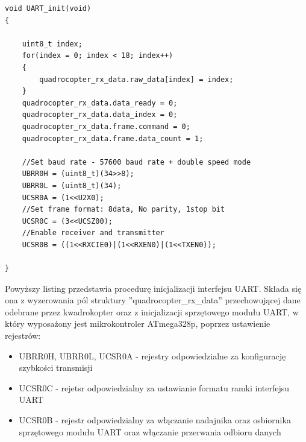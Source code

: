 \begin{lstlisting}
void UART_init(void)
{

    uint8_t index;
    for(index = 0; index < 18; index++)
    {
        quadrocopter_rx_data.raw_data[index] = index;
    }
    quadrocopter_rx_data.data_ready = 0;
    quadrocopter_rx_data.data_index = 0;
    quadrocopter_rx_data.frame.command = 0;
    quadrocopter_rx_data.frame.data_count = 1;

	//Set baud rate - 57600 baud rate + double speed mode
	UBRR0H = (uint8_t)(34>>8);
	UBRR0L = (uint8_t)(34);
	UCSR0A = (1<<U2X0);
	//Set frame format: 8data, No parity, 1stop bit
	UCSR0C = (3<<UCSZ00);
	//Enable receiver and transmitter
	UCSR0B = ((1<<RXCIE0)|(1<<RXEN0)|(1<<TXEN0));

}
\end{lstlisting}

Powyższy listing przedstawia procedurę inicjalizacji interfejsu UART. Składa się ona z wyzerowania pól struktury ''quadrocopter\_rx\_data'' przechowującej dane odebrane przez kwadrokopter oraz z inicjalizacji sprzętowego modułu UART, w który wyposażony jest mikrokontroler ATmega328p, poprzez ustawienie rejestrów:
\begin{itemize}
	\item UBRR0H, UBRR0L, UCSR0A - rejestry odpowiedzialne za konfigurację szybkości transmisji
	\item UCSR0C - rejetsr odpowiedzialny za ustawianie formatu ramki interfejsu UART
	\item UCSR0B - rejestr odpowiedzialny za włączanie nadajnika oraz osbiornika sprzętowego modułu UART oraz włączanie przerwania odbioru danych
\end{itemize}

